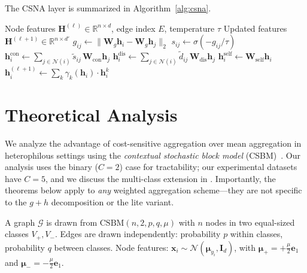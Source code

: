 \documentclass[runningheads]{llncs}
\newcommand{\R}{\mathbb{R}}
\newcommand{\N}{\mathcal{N}}
\newcommand{\G}{\mathcal{G}}
\newcommand{\bW}{\mathbf{W}}
\newcommand{\bx}{\mathbf{x}}
\newcommand{\bh}{\mathbf{h}}
\begin{document}
The CSNA layer is summarized in Algorithm~\ref{alg:csna}.

\begin{algorithm}[t]
\caption{CSNA Layer (Lite Version)}\label{alg:csna}
\begin{algorithmic}[1]
\REQUIRE Node features $\mathbf{H}^{(\ell)} \in \R^{n \times d}$, edge index $E$, temperature $\tau$
\ENSURE Updated features $\mathbf{H}^{(\ell+1)} \in \R^{n \times d'}$
    \STATE $g_{ij} \leftarrow \|\bW_g \bh_i - \bW_g \bh_j\|_2$ 
    \STATE $s_{ij} \leftarrow \sigma(-g_{ij}/\tau)$ 
\ENDFOR
{}
    \STATE $\bh_i^{\text{con}} \leftarrow \sum_{j \in \N(i)} \tilde{s}_{ij}\, \bW_{\text{con}} \bh_j$ 
    \STATE $\bh_i^{\text{dis}} \leftarrow \sum_{j \in \N(i)} \tilde{d}_{ij}\, \bW_{\text{dis}} \bh_j$ 
    \STATE $\bh_i^{\text{self}} \leftarrow \bW_{\text{self}} \bh_i$ 
    \STATE $\bh_i^{(\ell+1)} \leftarrow \sum_k \gamma_k(\bh_i) \cdot \bh_i^k$ 
\ENDFOR
\end{algorithmic}
\end{algorithm}


\section{Theoretical Analysis}\label{sec:theory}

We analyze the advantage of cost-sensitive aggregation over mean aggregation in heterophilous settings using the \emph{contextual stochastic block model} (CSBM)~\cite{zhu2020beyond}.
Our analysis uses the binary ($C=2$) case for tractability; our experimental datasets have $C=5$, and we discuss the multi-class extension in .
Importantly, the theorems below apply to \emph{any} weighted aggregation scheme---they are not specific to the $g+h$ decomposition or the lite variant.

\begin{definition}\label{def:csbm}
A graph $\G$ is drawn from $\mathrm{CSBM}(n, 2, p, q, \mu)$ with $n$ nodes in two equal-sized classes $V_+, V_-$.
Edges are drawn independently: probability $p$ within classes, probability $q$ between classes.
Node features: $\bx_i \sim \mathcal{N}(\boldsymbol{\mu}_{y_i}, \mathbf{I}_d)$, with $\boldsymbol{\mu}_+ = +\frac{\mu}{2}\mathbf{e}_1$ and $\boldsymbol{\mu}_- = -\frac{\mu}{2}\mathbf{e}_1$.
\end{definition}
\end{document}
